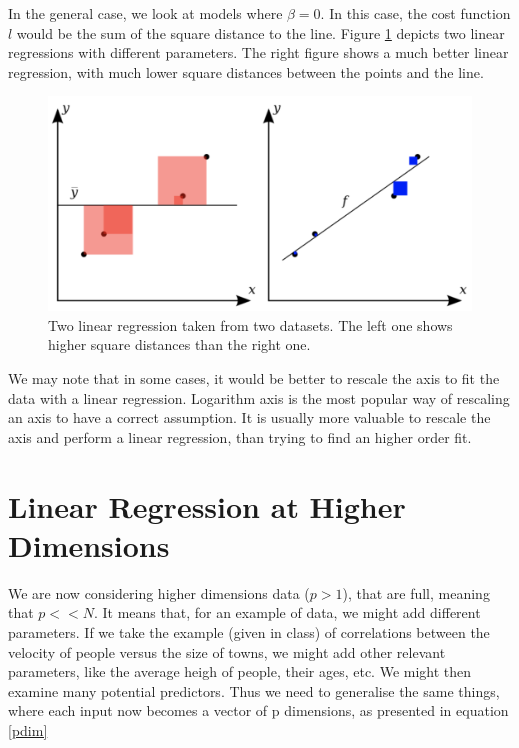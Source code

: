 \documentclass[a4paper]{tufte-book}
\begin{document}
In the general case, we look at models where $\beta = 0$. In this case, the cost
function $l$ would be the sum of the square distance to the line.
Figure \ref{squaredistances} depicts two linear regressions with different
parameters. The right figure shows a much better linear regression, with
much lower square distances between the points and the line.

\begin{figure}
    \includegraphics{./Figures/squaredistances.png}
    \caption{Two linear regression taken from two datasets. The left one shows higher square distances than the right one.}
    \label{squaredistances}
\end{figure}

We may note that in some cases, it would be better to rescale the axis to
fit the data with a linear regression. Logarithm axis is the most popular way
of rescaling an axis to have a correct assumption. It is usually more valuable
to rescale the axis and perform a linear regression, than trying to find an
higher order fit.

\section{Linear Regression at Higher Dimensions}

We are now considering higher dimensions data ($p>1$), that are full, meaning
that $p<<N$.
It means that, for an example of data, we might add different parameters. If we
take the example (given in class) of correlations between the velocity of people
versus the size of towns, we might add other relevant parameters, like the
average heigh of people, their ages, etc. We might then examine many potential
predictors. Thus we need to generalise the same things, where each input now
becomes a vector of p dimensions, as presented in equation \ref{pdim}
\end{document}
